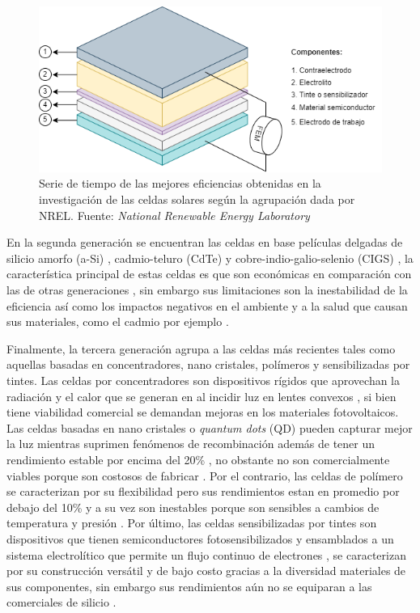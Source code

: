 \begin{figure}[h!]
    \label{img:CSPT}
    \includegraphics[scale=0.7]{img/DSSC.png}
    \caption{Serie de tiempo de las mejores eficiencias obtenidas en la investigación de las celdas solares según la agrupación dada por NREL.
    Fuente: \textit{National Renewable Energy Laboratory} \cite{owidenergy}}
\end{figure}
En la segunda generación se encuentran las celdas en base películas delgadas de silicio amorfo (a-Si) \cite{kaur2016review}, cadmio-teluro (CdTe) \cite{bertolli2008} y cobre-indio-galio-selenio (CIGS) \cite{bagher2015types}, la característica principal de estas celdas es que son económicas en comparación con las de otras generaciones \cite{rathore2021}, sin embargo sus limitaciones son la inestabilidad de la eficiencia \cite{gul2016review} así como los impactos negativos en el ambiente y a la salud que causan sus materiales, como el cadmio por ejemplo \cite{bagher2015types}. 

Finalmente, la tercera generación agrupa a las celdas más recientes tales como aquellas basadas en concentradores, nano cristales, polímeros y sensibilizadas por tintes. Las celdas por concentradores son dispositivos rígidos que aprovechan la radiación y el calor que se generan en al incidir luz en lentes convexos \cite{bertolli2008}, si bien tiene viabilidad comercial se demandan mejoras en los materiales fotovoltaicos. Las celdas basadas en nano cristales o \textit{quantum dots} (QD) pueden capturar mejor la luz mientras suprimen fenómenos de recombinación además de tener un rendimiento estable por encima del 20\% \cite{kim2022conformal}, no obstante no son comercialmente viables porque son costosos de fabricar \cite{jean2018synthesis}. Por el contrario, las celdas de polímero se caracterizan por su flexibilidad pero sus rendimientos estan en promedio por debajo del 10\% y a su vez son inestables porque son sensibles a cambios de temperatura y presión \cite{gusain2019polymer}. Por último, las celdas sensibilizadas por tintes son dispositivos que tienen semiconductores fotosensibilizados y ensamblados a un sistema electrolítico que permite un flujo continuo de electrones \cite{suhaimi2015materials}, se caracterizan por su construcción versátil y de bajo costo gracias a la diversidad materiales de sus componentes, sin embargo sus rendimientos aún no se equiparan a las comerciales de silicio \cite{sharma2018dye}. 


